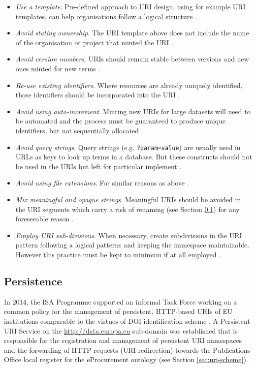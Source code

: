 	\begin{itemize}
		\item \textit{Use a template}. Pre-defined approach to URI design, using for example URI templates, can help organisations follow a logical structure \cite{d7.1.3-2012,d4.02.02-2018}.
		\item \textit{Avoid stating ownership}. The URI template above does not include the name of the organisation or project that minted the URI \cite{d7.1.3-2012,d4.02.02-2018}.
		\item \textit{Avoid version numbers}. URIs should remain stable between versions and new ones minted for new terms \cite{d7.1.3-2012,d4.02.02-2018}.
		\item \textit{Re-use existing identifiers}. Where resources are already uniquely identified, those identifiers should be incorporated into the URI \cite{d7.1.3-2012}.
		\item \textit{Avoid using auto-increment}. Minting new URIs for large datasets will need to be automated and the process must be guaranteed to produce unique identifiers, but not sequentially allocated \cite{d7.1.3-2012}. 
		\item \textit{Avoid query strings}. Query strings (e.g. \texttt{?param=value}) are usually used in URLs as keys to look up terms in a database. But these constructs should not be used in the URIs but left for particular implement \cite{d7.1.3-2012}. 
		\item \textit{Avoid using file extensions}. For similar reasons as above \cite{d7.1.3-2012}. 
		\item \textit{Mix meaningful and opaque strings}. Meaningful URIs should be avoided in the URI segments which carry a risk of renaming (see Section \ref{sec:persistence}) for any foreseeable reason \cite{d4.02.02-2018}.  
		\item \textit{Employ URI sub-divisions}. When necessary, create subdivisions in the URI pattern following a logical patterns and keeping the namespace maintainable. However this practice must be kept to minimum if at all employed \cite{d4.02.02-2018}. 		
	\end{itemize}
	
	\subsection{Persistence}
	\label{sec:persistence}
	
	In 2014, the ISA Programme supported an informal Task Force working on a common policy for the management of persistent, HTTP-based URIs of EU institutions comparable to the virtues of DOI identification scheme  \citep{d4.02.3-2018}. A Persistent URI Service on the \url{http://data.europa.eu} sub-domain was established that is responsible for the registration and management of persistent URI namespaces and the forwarding of HTTP requests (URI redirection) towards the Publications Office local register for the eProcurement ontology (see Section \ref{sec:uri-scheme}). 

